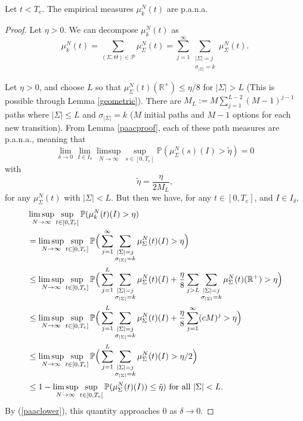 \begin{theorem} Let $t< T_e$. The empirical measures $\mu_k^N(t)$ are p.a.n.a.
\end{theorem}
\begin{proof}
Let $\eta>0$.  We can decompose $\mu_k^N(t)$ as
\begin{equation}
 \mu_k^N(t) = \sum_{(\Sigma, \Theta) \in \mathcal P} \mu_\Sigma^N(t) =\sum_{j = 1}^\infty \sum_{\substack{ |\Sigma | = j\\\sigma_{|\Sigma|} = k}} \mu_\Sigma^N(t).
\end{equation}

Let $\eta>0$, and choose $L$ so that $\mu^N_\Sigma(t)(\mathbb{R}^+) \le \eta/8$ for $|\Sigma|> L$ (This is possible through Lemma \ref{geometric}).   There are $M_L:=M\sum_{j = 1}^{L-2}(M-1)^{j-1}$ paths where $|\Sigma|\le L$ and $\sigma_{|\Sigma|} = k$  ($M$ initial paths and $M-1$ options for each new transition). From Lemma \ref{paacproof}, each of these path measures are  p.a.n.a., meaning that
  \begin{equation}\label{paaclower}
  \lim_{\delta \rightarrow 0}\lim_{I \in {I_\delta}}\limsup_{N\rightarrow \infty}\sup_{s \in [0,T_e]}\mathbb{P}(\mu_\Sigma^N(s)(I)>\tilde \eta) = 0 
  \end{equation}
  with 
\begin{equation}
\tilde \eta = \frac{\eta}{2M_L},
\end{equation}
 for any $\mu_\Sigma^N(t)$ with $|\Sigma|<L$. But then we have, for any $t \in [0, T_e]$,
and $I \in I_\delta$, 
\begin{align}
&\limsup_{N\rightarrow \infty}\sup_{t \in [0,T_e]}\mathbb{P}(\mu_k^N(t)(I)>\eta)\\
&= \limsup_{N\rightarrow \infty} \sup_{t \in [0,T_e]}\mathbb P \Big(\sum_{j = 1}^\infty \sum_{\substack{ |\Sigma | = j\\\sigma_{|\Sigma|} = k}}\mu_\Sigma^N(t)(I)>\eta\Big ) \nonumber \\
&\le \limsup_{N\rightarrow \infty}  \sup_{t \in [0,T_e]}\mathbb P\Big(\sum_{j = 1}^{L} \sum_{\substack{ |\Sigma | = j\\\sigma_{|\Sigma|} = k}} \mu_\Sigma^N(t)(I)  +\frac{\eta}8\sum_{j > L}\sum_{\substack{ |\Sigma | = j\\\sigma_{|\Sigma|} = k}} \mu_\Sigma^N(t)(\mathbb{R}^+)>\eta\Big)\nonumber \\
&\le \limsup_{N\rightarrow \infty}  \sup_{t \in [0,T_e]}\mathbb P\Big(\sum_{j = 1}^{L} \sum_{\substack{ |\Sigma | = j\\\sigma_{|\Sigma|} = k}} \mu_\Sigma^N(t)(I)  +\frac{\eta}8\sum_{j = 1}^\infty (cM)^j>\eta\Big)\nonumber \\
 &\le \limsup_{N\rightarrow \infty} \sup_{t \in [0,T_e]}\mathbb P\Big(\sum_{j = 1}^L \sum_{\substack{ |\Sigma | = j\\\sigma_{|\Sigma|} = k}} \mu_\Sigma^N(t)(I)  >\eta/2\Big)\nonumber \\
 &\le 1-\limsup_{N\rightarrow \infty}\sup_{t \in [0,T_e]}\mathbb  P( \mu_\Sigma^N(t)(I))  \le\tilde \eta) \hbox { for all } |\Sigma|<L.\nonumber 
\end{align}
By (\ref{paaclower}), this quantity approaches 0 as $\delta \rightarrow 0$.
\end{proof}
